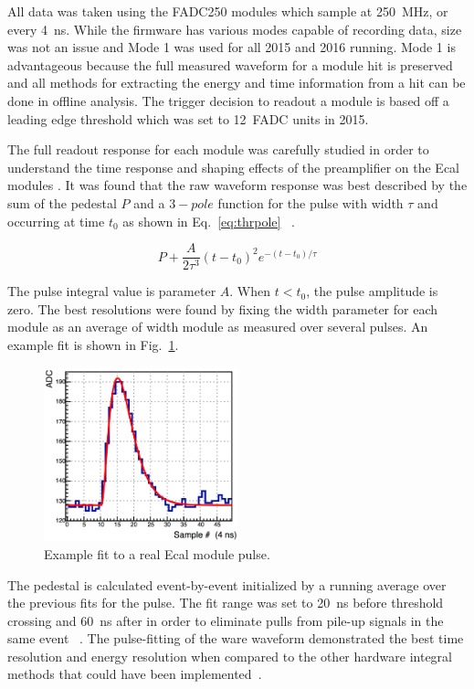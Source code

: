 All data was taken using the FADC250 modules which sample at 250~MHz, or every 4~ns. While the firmware has various modes capable of recording data, size was not an issue and Mode 1 was used for all 2015 and 2016 running. Mode 1 is advantageous because the full measured waveform for a module hit is preserved and all methods for extracting the energy and time information from a hit can be done in offline analysis. The trigger decision to readout a module is based off a leading edge threshold which was set to 12~FADC units in 2015. 

The full readout response for each module was carefully studied in order to understand the time response and shaping effects of the preamplifier on the Ecal modules \cite{Charles}. It was found that the raw waveform response was best described by the sum of the pedestal $P$ and a $3-pole$ function for the pulse with width $\tau$ and occurring at time $t_0$ as shown in Eq.~\eqref{eq:thrpole} ~\cite{Charles}.

\begin{equation}
	\label{eq:thrpole}
	P + \dfrac{A}{2\tau^3}(t-t_0)^2e^{-(t-t_0)/\tau} 
\end{equation}

The pulse integral value is parameter $A$. When $t<t_0$, the pulse amplitude is zero. The best resolutions were found by fixing the width parameter for each module as an average of width module as measured over several pulses. An example fit is shown in Fig.~\ref{Figure:mode1fit}.

\begin{figure}[H]
  \centering
      \includegraphics[width=0.5\textwidth]{pics/performance/mode1fit.png}
  \caption[Pulse-fitting to Mode-1 Ecal data]{Example fit to a real Ecal module pulse.}
  \label{Figure:mode1fit}
\end{figure}

The pedestal is calculated event-by-event initialized by a running average over the previous fits for the pulse. The fit range was set to 20~ns before threshold crossing and 60~ns after in order to eliminate pulls from pile-up signals in the same event ~\cite{Baltzell}. The pulse-fitting of the ware waveform demonstrated the best time resolution and energy resolution when compared to the other hardware integral methods that could have been implemented~\cite{Baltzell}.
